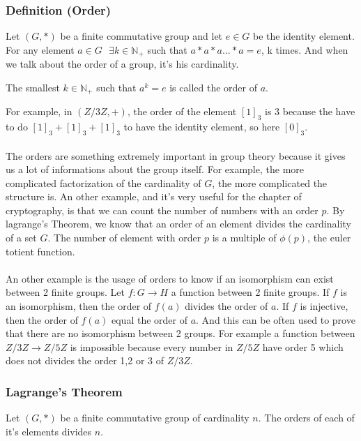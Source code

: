 \documentclass{article}
\begin{document}
\subsubsection{Definition (Order)}
Let $ (G, *) $ be a finite commutative group and let $ e \in G $ be the identity element. For any element $ a \in G \textit{  } \exists k \in \mathbb{N_+} $ such that $ a*a*a...*a = e $, k times. And when we talk about the order of a group, it's his cardinality.
\begin{tcolorbox}[sharp corners, colback=green!30, colframe=green!80!blue, title=Order of an element]
The smallest $ k \in \mathbb{N_+} $ such that $ a^k = e $ is called the order of $ a $.
\end{tcolorbox}
For example, in $ (Z/3Z, +) $, the order of the element $ [1]_3 $ is $ 3 $ because the have to do $ [1]_3 + [1]_3 + [1]_3 $ to have the identity element, so here $ [0]_3 $.
\\
\\
The orders are something extremely important in group theory because it gives us a lot of informations about the group itself. For example, the more complicated factorization of the cardinality of $ G $, the more complicated the structure is. An other example, and it's very useful for the chapter of cryptography, is that we can count the number of numbers with an order $ p $. By lagrange's Theorem, we know that an order of an element divides the cardinality of a set $ G $. The number of element with order $ p $ is a multiple of $ \phi(p) $, the euler totient function.
\\
\\
An other example is the usage of orders to know if an isomorphism can exist between 2 finite groups. Let $ f:G \rightarrow H $ a function between 2 finite groups. If $ f $ is an isomorphism, then the order of $ f(a) $ divides the order of $ a $. If $ f $ is injective, then the order of $ f(a) $ equal the order of $ a $. And this can be often used to prove that there are no isomorphism between 2 groups. For example a function between $ Z/3Z \rightarrow Z/5Z $ is impossible because every number in $ Z/5Z $ have order 5 which does not divides the order 1,2 or 3 of $ Z/3Z $.

\subsubsection{Lagrange's Theorem} 
\begin{tcolorbox}[sharp corners, colback=green!30, colframe=green!80!blue, title=Lagrange's Theorem]
Let $ (G, *) $ be a finite commutative group of cardinality $ n $. The orders of each of it's elements divides $ n $.
\end{tcolorbox}
\end{document}
